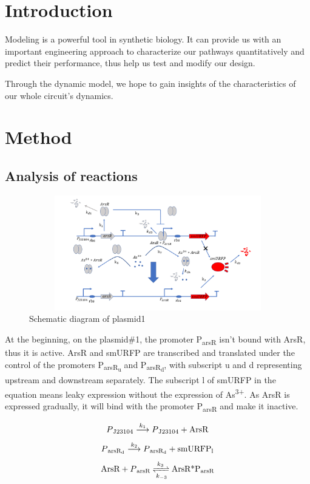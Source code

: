 \section{Introduction}
Modeling is a powerful tool in synthetic biology. It can provide us with an important engineering approach to characterize our pathways quantitatively and predict their performance, thus help us test and modify our design.

Through the dynamic model, we hope to gain insights of the characteristics of our whole circuit's dynamics.

\section{Method}
\subsection{Analysis of reactions}
\begin{figure}[h]
\centering
\includegraphics[width=12cm,height=5cm]{1}
\caption{Schematic diagram of plasmid1}
\end{figure}

At the beginning, on the plasmid\#1, the promoter P\textsubscript{arsR} isn't bound with ArsR, thus it is active. ArsR and smURFP are transcribed and translated under the control of the promoters P\textsubscript{arsR\textsubscript{u}} and P\textsubscript{arsR\textsubscript{d}}, with subscript u and d representing upstream and downstream separately. The subscript l of smURFP in the equation means leaky expression without the expression of As\textsuperscript{3+}. As ArsR is expressed gradually, it will bind with the promoter P\textsubscript{arsR} and make it inactive. \cite{pola2018novel}

\begin{equation}
P\textsubscript{J23104}\stackrel{k_1}{\longrightarrow} P\textsubscript{J23104}+\text{ArsR}
\end{equation}
\begin{equation}
P\textsubscript{arsR\textsubscript{d}} \stackrel{k_2}{\longrightarrow} P\textsubscript{arsR\textsubscript{d}} +\text{smURFP\textsubscript{l}}
\end{equation}
\begin{equation}
\text{ArsR}+P\textsubscript{arsR} \xrightleftharpoons[k_{-3}]{k_3}\text{ArsR*P\textsubscript{arsR}}
\end{equation} 


